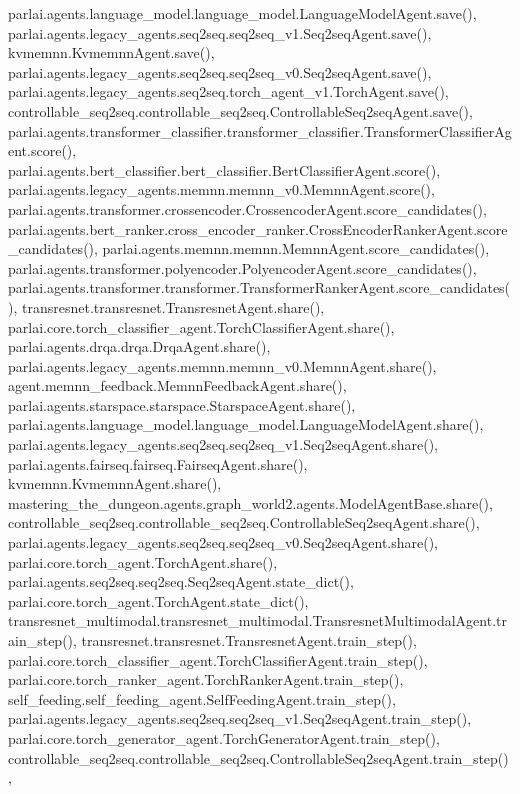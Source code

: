 parlai.\+agents.\+language\+\_\+model.\+language\+\_\+model.\+Language\+Model\+Agent.\+save(), parlai.\+agents.\+legacy\+\_\+agents.\+seq2seq.\+seq2seq\+\_\+v1.\+Seq2seq\+Agent.\+save(), kvmemnn.\+Kvmemnn\+Agent.\+save(), parlai.\+agents.\+legacy\+\_\+agents.\+seq2seq.\+seq2seq\+\_\+v0.\+Seq2seq\+Agent.\+save(), parlai.\+agents.\+legacy\+\_\+agents.\+seq2seq.\+torch\+\_\+agent\+\_\+v1.\+Torch\+Agent.\+save(), controllable\+\_\+seq2seq.\+controllable\+\_\+seq2seq.\+Controllable\+Seq2seq\+Agent.\+save(), parlai.\+agents.\+transformer\+\_\+classifier.\+transformer\+\_\+classifier.\+Transformer\+Classifier\+Agent.\+score(), parlai.\+agents.\+bert\+\_\+classifier.\+bert\+\_\+classifier.\+Bert\+Classifier\+Agent.\+score(), parlai.\+agents.\+legacy\+\_\+agents.\+memnn.\+memnn\+\_\+v0.\+Memnn\+Agent.\+score(), parlai.\+agents.\+transformer.\+crossencoder.\+Crossencoder\+Agent.\+score\+\_\+candidates(), parlai.\+agents.\+bert\+\_\+ranker.\+cross\+\_\+encoder\+\_\+ranker.\+Cross\+Encoder\+Ranker\+Agent.\+score\+\_\+candidates(), parlai.\+agents.\+memnn.\+memnn.\+Memnn\+Agent.\+score\+\_\+candidates(), parlai.\+agents.\+transformer.\+polyencoder.\+Polyencoder\+Agent.\+score\+\_\+candidates(), parlai.\+agents.\+transformer.\+transformer.\+Transformer\+Ranker\+Agent.\+score\+\_\+candidates(), transresnet.\+transresnet.\+Transresnet\+Agent.\+share(), parlai.\+core.\+torch\+\_\+classifier\+\_\+agent.\+Torch\+Classifier\+Agent.\+share(), parlai.\+agents.\+drqa.\+drqa.\+Drqa\+Agent.\+share(), parlai.\+agents.\+legacy\+\_\+agents.\+memnn.\+memnn\+\_\+v0.\+Memnn\+Agent.\+share(), agent.\+memnn\+\_\+feedback.\+Memnn\+Feedback\+Agent.\+share(), parlai.\+agents.\+starspace.\+starspace.\+Starspace\+Agent.\+share(), parlai.\+agents.\+language\+\_\+model.\+language\+\_\+model.\+Language\+Model\+Agent.\+share(), parlai.\+agents.\+legacy\+\_\+agents.\+seq2seq.\+seq2seq\+\_\+v1.\+Seq2seq\+Agent.\+share(), parlai.\+agents.\+fairseq.\+fairseq.\+Fairseq\+Agent.\+share(), kvmemnn.\+Kvmemnn\+Agent.\+share(), mastering\+\_\+the\+\_\+dungeon.\+agents.\+graph\+\_\+world2.\+agents.\+Model\+Agent\+Base.\+share(), controllable\+\_\+seq2seq.\+controllable\+\_\+seq2seq.\+Controllable\+Seq2seq\+Agent.\+share(), parlai.\+agents.\+legacy\+\_\+agents.\+seq2seq.\+seq2seq\+\_\+v0.\+Seq2seq\+Agent.\+share(), parlai.\+core.\+torch\+\_\+agent.\+Torch\+Agent.\+share(), parlai.\+agents.\+seq2seq.\+seq2seq.\+Seq2seq\+Agent.\+state\+\_\+dict(), parlai.\+core.\+torch\+\_\+agent.\+Torch\+Agent.\+state\+\_\+dict(), transresnet\+\_\+multimodal.\+transresnet\+\_\+multimodal.\+Transresnet\+Multimodal\+Agent.\+train\+\_\+step(), transresnet.\+transresnet.\+Transresnet\+Agent.\+train\+\_\+step(), parlai.\+core.\+torch\+\_\+classifier\+\_\+agent.\+Torch\+Classifier\+Agent.\+train\+\_\+step(), parlai.\+core.\+torch\+\_\+ranker\+\_\+agent.\+Torch\+Ranker\+Agent.\+train\+\_\+step(), self\+\_\+feeding.\+self\+\_\+feeding\+\_\+agent.\+Self\+Feeding\+Agent.\+train\+\_\+step(), parlai.\+agents.\+legacy\+\_\+agents.\+seq2seq.\+seq2seq\+\_\+v1.\+Seq2seq\+Agent.\+train\+\_\+step(), parlai.\+core.\+torch\+\_\+generator\+\_\+agent.\+Torch\+Generator\+Agent.\+train\+\_\+step(), controllable\+\_\+seq2seq.\+controllable\+\_\+seq2seq.\+Controllable\+Seq2seq\+Agent.\+train\+\_\+step(), 